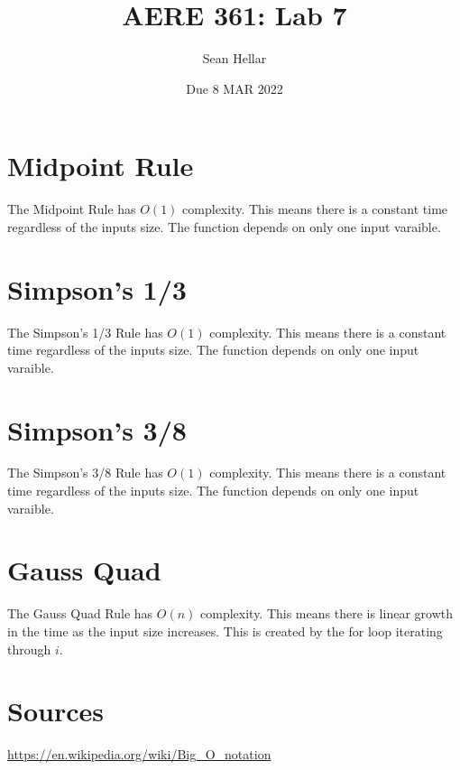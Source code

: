 \documentclass{article}
\title{AERE 361: Lab 7}
\date{Due 8 MAR 2022}
\author{Sean Hellar}
\begin{document}
\maketitle
\newpage

\section{Midpoint Rule}

The Midpoint Rule has ${O(1)}$ complexity. This means there is a constant time regardless of the inputs size. The function depends on only one input varaible. 


\newpage

\section{Simpson's 1/3}

The Simpson's 1/3 Rule has ${O(1)}$ complexity. This means there is a constant time regardless of the inputs size. The function depends on only one input varaible. 


\newpage

\section{Simpson's 3/8}

The Simpson's 3/8 Rule has ${O(1)}$ complexity. This means there is a constant time regardless of the inputs size. The function depends on only one input varaible.


\newpage

\section{Gauss Quad}

The Gauss Quad Rule has ${O(n)}$ complexity. This means there is linear growth in the time as the input size increases. This is created by the for loop iterating through ${i}$.  
 


\newpage

\section{Sources}

\url{https://en.wikipedia.org/wiki/Big_O_notation}
\end{document}
